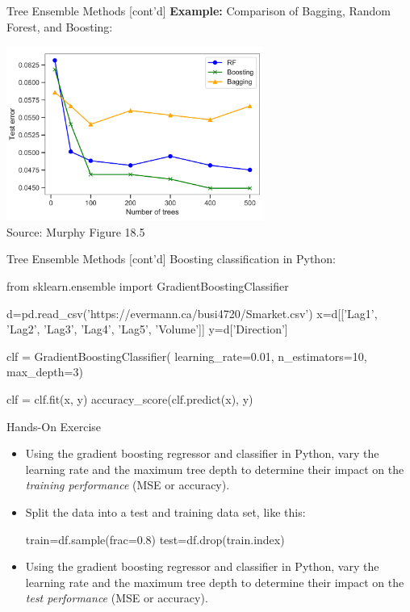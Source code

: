 \documentclass[ignorenonframetext,xcolor=x11names]{beamer}
\begin{document}
\begin{frame}{Tree Ensemble Methods \small [cont'd]}
\textbf{Example:} Comparison of Bagging, Random Forest, and Boosting:

\centering

\includegraphics[height=2.25in]{murphy_18_05.png} \\

\scriptsize Source: Murphy Figure 18.5 \normalsize
\end{frame}

\begin{frame}[fragile]{Tree Ensemble Methods \small [cont'd]}
Boosting classification in Python:

\begin{pythoncode}
from sklearn.ensemble import GradientBoostingClassifier

d=pd.read_csv('https://evermann.ca/busi4720/Smarket.csv')
x=d[['Lag1', 'Lag2', 'Lag3', 'Lag4', 'Lag5', 'Volume']]
y=d['Direction']
\end{pythoncode}

\begin{pythoncode}
clf = GradientBoostingClassifier(
         learning_rate=0.01,
         n_estimators=10, 
         max_depth=3)

clf = clf.fit(x, y)
accuracy_score(clf.predict(x), y)
\end{pythoncode}
\end{frame}

\begin{frame}[fragile]{Hands-On Exercise}
\begin{itemize}
\item Using the gradient boosting regressor and classifier in Python, vary the learning rate and the maximum tree depth to determine their impact on the \emph{training performance} (MSE or accuracy).
\item Split the data into a test and training data set, like this:
\begin{pythoncode}
train=df.sample(frac=0.8)
test=df.drop(train.index)
\end{pythoncode}
\item Using the gradient boosting regressor and classifier in Python, vary the learning rate and the maximum tree depth to determine their impact on the \emph{test performance} (MSE or accuracy).
\end{itemize}
\end{frame}
\end{document}
